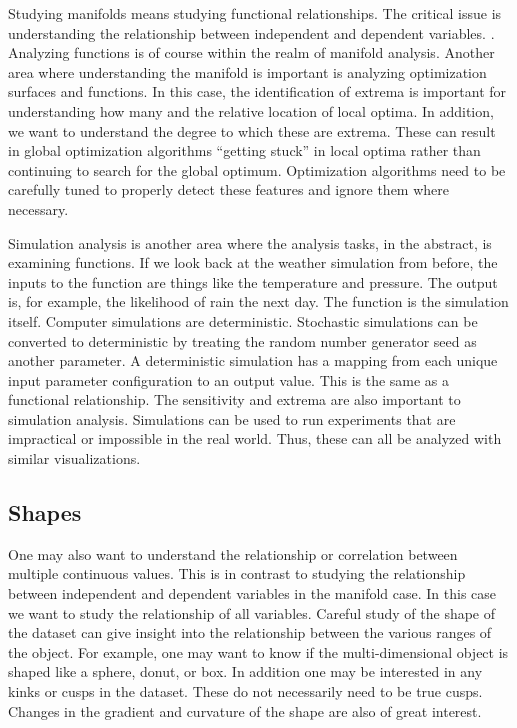 Studying manifolds means studying functional relationships. The critical issue
is understanding the relationship between independent and dependent variables.
. Analyzing functions is of course within the realm of
manifold analysis.  Another area where understanding
the manifold is important is analyzing optimization surfaces and functions.  In
this case, the identification of extrema is important for understanding how
many and the relative location of local optima. In addition, we want to
understand the degree to which these are extrema. These can result in global
optimization algorithms ``getting stuck'' in local optima rather than
continuing to search for the global optimum. Optimization algorithms need to be
carefully tuned to properly detect these features and ignore them where
necessary.

Simulation analysis is another area where the analysis tasks, in the abstract,
is examining functions. If we look back at the weather simulation from before,
the inputs to the function are things like the temperature and pressure.
The output is, for example, the likelihood of rain the
next day. The function is the simulation itself. Computer simulations are
deterministic. Stochastic simulations can be converted to deterministic by
treating the random number generator seed as another parameter.  A
deterministic simulation has a mapping from each unique input parameter
configuration to an output value. This is the same as a functional
relationship. The sensitivity and extrema are also important to simulation
analysis. Simulations can be used to run experiments that are impractical or
impossible in the real world. Thus, these can all be analyzed with similar
visualizations.



\subsection{Shapes}
\label{sec:shapes}

One may also want to understand the relationship or correlation between
multiple continuous values. This is in contrast to studying the relationship
between independent and dependent variables in the manifold case. In this case
we want to study the relationship of all variables. Careful study of the shape
of the dataset can give insight into the relationship between the various
ranges of the object. For example, one may want to know if the
multi-dimensional object is shaped like a sphere, donut, or box.  In addition
one may be interested in any kinks or cusps in the dataset. 
These do not necessarily need to be true cusps. Changes in the gradient and
curvature of the shape are also of great interest.

